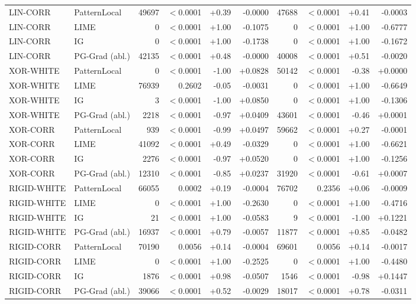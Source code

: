 \documentclass[pdflatex,sn-mathphys-num]{sn-jnl}
\theoremstyle{thmstyleone}
\theoremstyle{thmstyletwo}%
\theoremstyle{thmstylethree}%
\begin{document}
\begin{table}[t]
\begin{tabular}{ll rrrr rrrr}
\addlinespace
LIN-CORR & PatternLocal & 49697 & $<$0.0001 & +0.39 & -0.0000 & 47688 & $<$0.0001 & +0.41 & -0.0003 \\
LIN-CORR & LIME & 0 & $<$0.0001 & +1.00 & -0.1075 & 0 & $<$0.0001 & +1.00 & -0.6777 \\
LIN-CORR & IG & 0 & $<$0.0001 & +1.00 & -0.1738 & 0 & $<$0.0001 & +1.00 & -0.1672 \\
LIN-CORR & PG-Grad (abl.) & 42135 & $<$0.0001 & +0.48 & -0.0000 & 40008 & $<$0.0001 & +0.51 & -0.0020 \\
\addlinespace
XOR-WHITE & PatternLocal & 0 & $<$0.0001 & -1.00 & +0.0828 & 50142 & $<$0.0001 & -0.38 & +0.0000 \\
XOR-WHITE & LIME & 76939 & 0.2602 & -0.05 & -0.0031 & 0 & $<$0.0001 & +1.00 & -0.6649 \\
XOR-WHITE & IG & 3 & $<$0.0001 & -1.00 & +0.0850 & 0 & $<$0.0001 & +1.00 & -0.1306 \\
XOR-WHITE & PG-Grad (abl.) & 2218 & $<$0.0001 & -0.97 & +0.0409 & 43601 & $<$0.0001 & -0.46 & +0.0001 \\
\addlinespace
XOR-CORR & PatternLocal & 939 & $<$0.0001 & -0.99 & +0.0497 & 59662 & $<$0.0001 & +0.27 & -0.0001 \\
XOR-CORR & LIME & 41092 & $<$0.0001 & +0.49 & -0.0329 & 0 & $<$0.0001 & +1.00 & -0.6621 \\
XOR-CORR & IG & 2276 & $<$0.0001 & -0.97 & +0.0520 & 0 & $<$0.0001 & +1.00 & -0.1256 \\
XOR-CORR & PG-Grad (abl.) & 12310 & $<$0.0001 & -0.85 & +0.0237 & 31920 & $<$0.0001 & -0.61 & +0.0007 \\
\addlinespace
RIGID-WHITE & PatternLocal & 66055 & 0.0002 & +0.19 & -0.0004 & 76702 & 0.2356 & +0.06 & -0.0009 \\
RIGID-WHITE & LIME & 0 & $<$0.0001 & +1.00 & -0.2630 & 0 & $<$0.0001 & +1.00 & -0.4716 \\
RIGID-WHITE & IG & 21 & $<$0.0001 & +1.00 & -0.0583 & 9 & $<$0.0001 & -1.00 & +0.1221 \\
RIGID-WHITE & PG-Grad (abl.) & 16937 & $<$0.0001 & +0.79 & -0.0057 & 11877 & $<$0.0001 & +0.85 & -0.0482 \\
\addlinespace
RIGID-CORR & PatternLocal & 70190 & 0.0056 & +0.14 & -0.0004 & 69601 & 0.0056 & +0.14 & -0.0017 \\
RIGID-CORR & LIME & 0 & $<$0.0001 & +1.00 & -0.2525 & 0 & $<$0.0001 & +1.00 & -0.4480 \\
RIGID-CORR & IG & 1876 & $<$0.0001 & +0.98 & -0.0507 & 1546 & $<$0.0001 & -0.98 & +0.1447 \\
RIGID-CORR & PG-Grad (abl.) & 39066 & $<$0.0001 & +0.52 & -0.0029 & 18017 & $<$0.0001 & +0.78 & -0.0311 \\
\bottomrule
\end{tabular}
\end{table}
\end{document}
